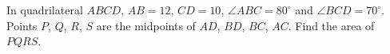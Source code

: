 In quadrilateral $ABCD$, $AB=12$, $CD=10$, $\angle ABC=80^\circ$ and $\angle BCD=70^\circ$. Points $P$, $Q$, $R$, $S$ are the midpoints of $AD$, $BD$, $BC$, $AC$. Find the area of $PQRS$.
